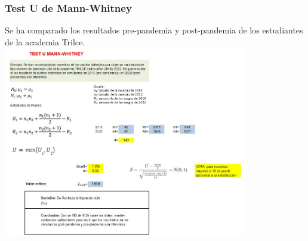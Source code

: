 \begin{frame}
    \frametitle{Test U de Mann-Whitney}
    Se ha comparado los resultados pre-pandemia y post-pandemia de los estudiantes de la academia Trilce.
    \includegraphics[width=0.8\textwidth]{cap/images/u_test/u_test.jpg}
\end{frame}
